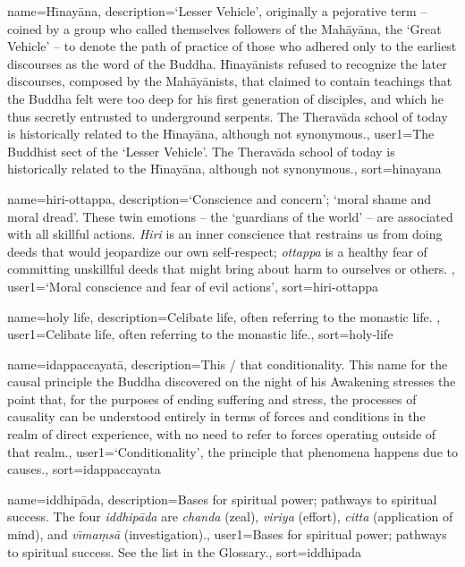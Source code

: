 {
name={H\={\i}nay\=ana},
description={`Lesser Vehicle', originally a pejorative term -- coined by a group who called themselves followers of the Mah\=ay\=ana, the `Great Vehicle' -- to denote the path of practice of those who adhered only to the earliest discourses as the word of the Buddha. H\={\i}nay\=anists refused to recognize the later discourses, composed by the Mah\=ay\=anists, that claimed to contain teachings that the Buddha felt were too deep for his first generation of disciples, and which he thus secretly entrusted to underground serpents. The Therav\=ada school of today is historically related to the H\={\i}nay\=ana, although not synonymous.},
user1={The Buddhist sect of the `Lesser Vehicle'. The Therav\=ada school of today is historically related to the H\={\i}nay\=ana, although not synonymous.},
sort={hinayana}
}

{
name={hiri-ottappa},
description={`Conscience and concern'; `moral shame and moral dread'. These twin emotions -- the `guardians of the world' -- are associated with all skillful actions. \textit{Hiri} is an inner conscience that restrains us from doing deeds that would jeopardize our own self-respect; \textit{ottappa} is a healthy fear of committing unskillful deeds that might bring about harm to ourselves or others. \protect \seepre %
\protect {}%
\protect \seepost %
},
user1={`Moral conscience and fear of evil actions'},
sort={hiri-ottappa}
}

{
name={holy life},
description={Celibate life, often referring to the monastic life. \protect \seepre %
\protect {}%
\protect \seepost %
},
user1={Celibate life, often referring to the monastic life.},
sort={holy-life}
}

{
name={idappaccayat\=a},
description={This / that conditionality. This name for the causal principle the Buddha discovered on the night of his Awakening stresses the point that, for the purposes of ending suffering and stress, the processes of causality can be understood entirely in terms of forces and conditions in the realm of direct experience, with no need to refer to forces operating outside of that realm.},
user1={`Conditionality', the principle that phenomena happens due to causes.},
sort={idappaccayata}
}

{
name=iddhip\=ada,
description={Bases for spiritual power; pathways to spiritual success. The four \textit{iddhip\=ada} are \textit{chanda} (zeal), \textit{viriya} (effort), \textit{citta} (application of mind), and \textit{v\={\i}ma\d{m}s\=a} (investigation).},
user1={Bases for spiritual power; pathways to spiritual success. See the list in the Glossary.},
sort={iddhipada}
}

